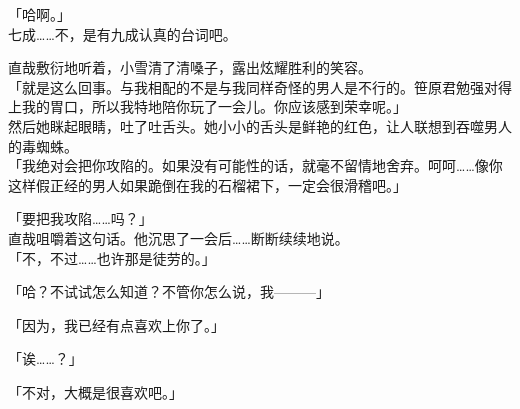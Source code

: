 「哈啊。」\\

七成……不，是有九成认真的台词吧。

直哉敷衍地听着，小雪清了清嗓子，露出炫耀胜利的笑容。\\

「就是这么回事。与我相配的不是与我同样奇怪的男人是不行的。笹原君勉强对得上我的胃口，所以我特地陪你玩了一会儿。你应该感到荣幸呢。」\\

然后她眯起眼睛，吐了吐舌头。她小小的舌头是鲜艳的红色，让人联想到吞噬男人的毒蜘蛛。\\

「我绝对会把你攻陷的。如果没有可能性的话，就毫不留情地舍弃。呵呵……像你这样假正经的男人如果跪倒在我的石榴裙下，一定会很滑稽吧。」

「要把我攻陷……吗？」\\

直哉咀嚼着这句话。他沉思了一会后……断断续续地说。\\

「不，不过……也许那是徒劳的。」

「哈？不试试怎么知道？不管你怎么说，我———」

「因为，我已经有点喜欢上你了。」

「诶……？」

「不对，大概是很喜欢吧。」

